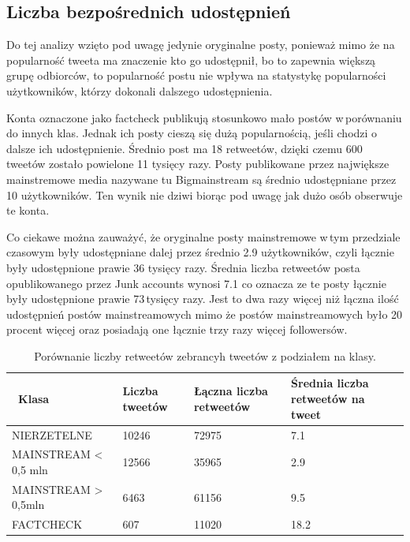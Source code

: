\subsection{Liczba bezpośrednich udostępnień }
Do tej analizy wzięto pod uwagę jedynie oryginalne posty, ponieważ mimo że na popularność tweeta ma znaczenie kto go udostępnił, bo to zapewnia większą grupę odbiorców, to popularność postu nie wpływa na statystykę popularności użytkowników, którzy dokonali dalszego udostępnienia. 
\par
Konta oznaczone jako factcheck publikują stosunkowo mało postów w\,porównaniu do innych klas. Jednak ich posty cieszą się dużą popularnością, jeśli chodzi o dalsze ich udostępnienie. Średnio post ma 18 retweetów, dzięki czemu 600 tweetów zostało powielone 11 tysięcy razy. Posty publikowane przez największe mainstremowe media nazywane tu Bigmainstream są średnio udostępniane przez 10 użytkowników. Ten wynik nie dziwi biorąc pod uwagę jak dużo osób obserwuje te konta.  
\par
Co ciekawe można zauważyć, że oryginalne posty mainstremowe w\,tym przedziale czasowym były udostępniane dalej przez średnio 2.9 użytkowników, czyli łącznie były udostępnione prawie 36 tysięcy razy. Średnia liczba retweetów posta opublikowanego przez Junk accounts wynosi 7.1 co oznacza ze te posty łącznie były udostępnione prawie 73\,tysięcy razy. Jest to dwa razy więcej niż łączna ilość udostępnień postów mainstreamowych mimo że postów mainstreamowych było 20 procent więcej oraz posiadają one łącznie trzy razy więcej followersów. 


\begin{table}[!h]
\centering
\caption{Porównanie liczby retweetów zebrancyh tweetów z podziałem na klasy.} \label{tab:liczbaretweetow}
\begin{tabular}{|m{}|R{2,5cm}|R{2,5cm}|R{2,5cm}|}  
\hline
~Klasa & Liczba tweetów & Łączna liczba retweetów & Średnia liczba retweetów na tweet \\ 
\hline
NIERZETELNE & 10246 & 72975 & 7.1 \\ 
\hline
MAINSTREAM \textless{} 0,5 mln & 12566 & 35965 & 2.9 \\ 
\hline
MAINSTREAM \textgreater{} 0,5mln & 6463 & 61156 & 9.5 \\ 
\hline
FACTCHECK & 607 & 11020 & 18.2 \\
\hline
\end{tabular}
\end{table}




